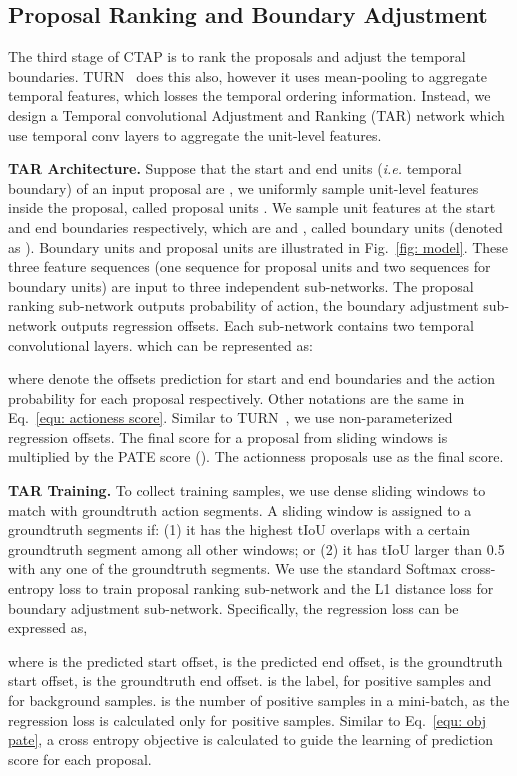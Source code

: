 \documentclass[runningheads]{llncs}
\begin{document}
\subsection{Proposal Ranking and Boundary Adjustment}
The third stage of CTAP is to rank the proposals and adjust the temporal boundaries. TURN~\cite{Gao_2017_ICCV} does this also, however it uses mean-pooling to aggregate temporal features, which losses the temporal ordering information. Instead, we design a Temporal convolutional Adjustment and Ranking (TAR) network which use temporal conv layers to aggregate the unit-level features. 

\textbf{TAR Architecture.} Suppose that the start and end units (\emph{i.e.} temporal boundary) of an input proposal  are , we uniformly sample  unit-level features inside the proposal, called proposal units . We sample  unit features at the start and end boundaries respectively, which are  and , called boundary units (denoted as ). 
Boundary units and proposal units are illustrated in Fig.~\ref{fig: model}. These three feature sequences (one sequence for proposal units and two sequences for boundary units) are input to three independent sub-networks. The proposal ranking sub-network outputs probability of action, the boundary adjustment sub-network outputs regression offsets. 
Each sub-network contains two temporal convolutional layers. which can be represented as:

where  denote the offsets prediction for start and end boundaries and the action probability for each proposal respectively.
Other notations are the same in Eq.~\ref{equ: actioness score}.
Similar to TURN~\cite{Gao_2017_ICCV}, we use non-parameterized regression offsets. The final score for a proposal  from sliding windows is multiplied by the PATE score (). The actionness proposals use  as the final score.


\textbf{TAR Training.} To collect training samples, we use dense sliding windows to match with groundtruth action segments. A sliding window is assigned to a groundtruth segments if: (1) it has the highest tIoU overlaps with a certain groundtruth segment among all other windows; or (2) it has tIoU larger than 0.5 with any one of the groundtruth segments. We use the standard Softmax cross-entropy loss to train proposal ranking sub-network and the L1 distance loss for boundary adjustment sub-network. Specifically, the regression loss can be expressed as,

where  is the predicted start offset,  is the predicted end offset,  is the groundtruth start offset,  is the groundtruth end offset.  is the label,  for positive samples and  for background samples.  is the number of positive samples in a mini-batch, as the regression loss is calculated only for positive samples. Similar to Eq.~\ref{equ: obj pate}, a cross entropy objective is calculated to guide the learning of prediction score  for each proposal.
\end{document}
